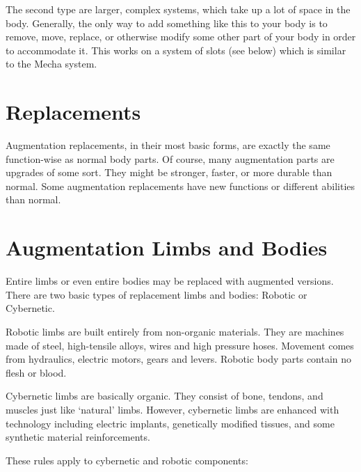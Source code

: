 \documentclass[twoside]{book}
\begin{document}
    {  
     The second type are larger, complex systems, which
             take up a lot of space in the body. Generally, the only way
             to add something like this to your body is to remove, move,
             replace, or otherwise modify some other part of your body in
             order to accommodate it. This works on a system of slots
             (see below) which is similar to the Mecha system. 
    }
  
    

\section{Replacements}
    
    {  
     Augmentation replacements, in their most basic forms,
             are exactly the same function-wise as normal body parts. Of
             course, many augmentation parts are upgrades of some sort.
             They might be stronger, faster, or more durable than normal.
             Some augmentation replacements have new functions or
             different abilities than normal. 
    }
  
    

\section{Augmentation Limbs and Bodies}
    
    {  
     Entire limbs or even entire bodies may be replaced
             with augmented versions. There are two basic types of
             replacement limbs and bodies: Robotic or Cybernetic. 
    }
  
    {  
     Robotic limbs are built entirely from non-organic
             materials. They are machines made of steel, high-tensile
             alloys, wires and high pressure hoses. Movement comes from
             hydraulics, electric motors, gears and levers. Robotic body
             parts contain no flesh or blood. 
    }
  
    {  
     Cybernetic limbs are basically organic. They consist
             of bone, tendons, and muscles just like
             `natural' limbs. However, cybernetic limbs are
             enhanced with technology including electric implants,
             genetically modified tissues, and some synthetic material
             reinforcements. 
    }
  
    {  
     These rules apply to cybernetic and robotic
             components: 
    }
  
\end{document}
